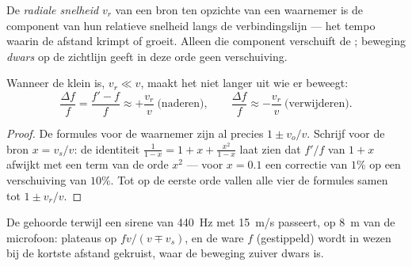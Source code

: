 \begin{definition}\label{def:g12:doppler-effect:radial}
De \emph{radiale snelheid} $v_r$ van een bron ten
opzichte van een waarnemer is de component van hun relatieve snelheid
langs de verbindingslijn --- het tempo waarin de afstand krimpt of groeit.
Alleen die component verschuift de ; beweging \emph{dwars} op
de zichtlijn geeft in deze orde geen verschuiving.
\end{definition}

\begin{proposition}\label{prop:g12:doppler-effect:slow}
Wanneer de  klein is, $v_r \ll v$, maakt het niet langer
uit wie er beweegt:
\[
\frac{\Delta f}{f} = \frac{f' - f}{f} \approx +\frac{v_r}{v} \ \text{(naderen)},
\qquad
\frac{\Delta f}{f} \approx -\frac{v_r}{v} \ \text{(verwijderen)}.
\]
\end{proposition}

\begin{proof}
De formules voor de waarnemer zijn al precies $1 \pm v_o/v$. Schrijf voor
de bron $x = v_s/v$: de identiteit
$\frac{1}{1 - x} = 1 + x + \frac{x^2}{1 - x}$ laat zien dat $f'/f$ van
$1 + x$ afwijkt met een term van de orde $x^2$ --- voor $x = 0.1$ een
correctie van $1\%$ op een verschuiving van $10\%$. Tot op de eerste orde
vallen alle vier de formules samen tot $1 \pm v_r/v$.
\end{proof}

\begin{omfigure}

{\small De gehoorde  terwijl een sirene van \qty{440}{Hz} met
\qty{15}{m/s} passeert, op \qty{8}{m} van de microfoon: plateaus op
$fv/(v \mp v_s)$, en de ware $f$ (gestippeld) wordt in wezen bij de
kortste afstand gekruist, waar de beweging zuiver dwars is.}
\end{omfigure}

